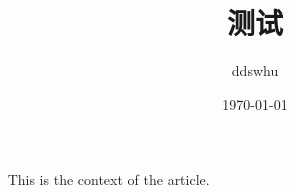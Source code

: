 \documentclass[UTF8]{article}
\title{测试}
\author{ddswhu}
\date{\today}
\begin{document}
\maketitle
​
This is the context of the article.
​
\end{document}
